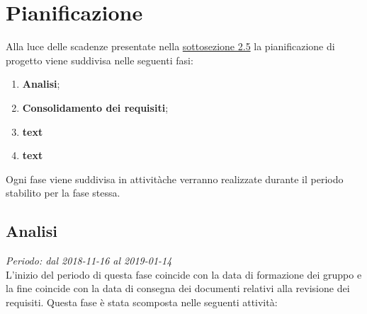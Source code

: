 \section{Pianificazione}
Alla luce delle scadenze presentate nella \hyperlink{scadenze}{sottosezione 2.5} la pianificazione di progetto viene suddivisa nelle seguenti fasi:
\begin{enumerate}
	\item \textbf{Analisi};
	\item \textbf{Consolidamento dei requisiti};
	\item \textbf{text}
	\item \textbf{text}
\end{enumerate}
Ogni fase viene suddivisa in attività\glosp che verranno realizzate durante il 
periodo stabilito per la fase stessa. 
\subsection{Analisi}
\textit{Periodo: dal 2018-11-16 al 2019-01-14}\\
L'inizio del periodo di questa fase coincide con la data di formazione dei 
gruppo e la fine coincide con la data di consegna dei documenti relativi alla 
revisione dei requisiti. Questa fase è stata scomposta nelle seguenti attività:
